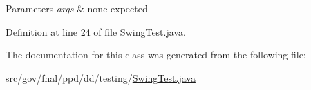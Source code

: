 \begin{DoxyParams}{Parameters}
{\em args} & none expected \\
\hline
\end{DoxyParams}


Definition at line 24 of file Swing\-Test.\-java.



The documentation for this class was generated from the following file\-:\begin{DoxyCompactItemize}
\item 
src/gov/fnal/ppd/dd/testing/\hyperlink{SwingTest_8java}{Swing\-Test.\-java}\end{DoxyCompactItemize}
